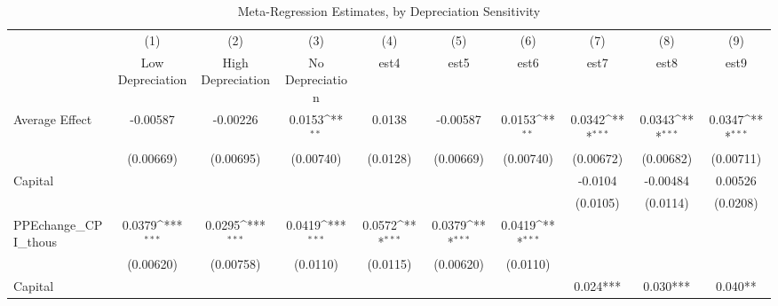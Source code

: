 \begin{table}[htbp]\centering
\def\sym#1{\ifmmode^{#1}\else\(^{#1}\)\fi}
\caption{Meta-Regression Estimates, by Depreciation Sensitivity \label{tab:capsens}}
\begin{tabular}{l*{9}{c}}
\hline\hline
                    &\multicolumn{1}{c}{(1)}&\multicolumn{1}{c}{(2)}&\multicolumn{1}{c}{(3)}&\multicolumn{1}{c}{(4)}&\multicolumn{1}{c}{(5)}&\multicolumn{1}{c}{(6)}&\multicolumn{1}{c}{(7)}&\multicolumn{1}{c}{(8)}&\multicolumn{1}{c}{(9)}\\
                    &\multicolumn{1}{c}{Low Depreciation}&\multicolumn{1}{c}{High Depreciation}&\multicolumn{1}{c}{No Depreciation}&\multicolumn{1}{c}{est4}&\multicolumn{1}{c}{est5}&\multicolumn{1}{c}{est6}&\multicolumn{1}{c}{est7}&\multicolumn{1}{c}{est8}&\multicolumn{1}{c}{est9}\\
\hline
Average Effect      &    -0.00587         &    -0.00226         &      0.0153\sym{**} &      0.0138         &    -0.00587         &      0.0153\sym{**} &      0.0342\sym{***}&      0.0343\sym{***}&      0.0347\sym{***}\\
                    &   (0.00669)         &   (0.00695)         &   (0.00740)         &    (0.0128)         &   (0.00669)         &   (0.00740)         &   (0.00672)         &   (0.00682)         &   (0.00711)         \\
Capital             &                     &                     &                     &                     &                     &                     &     -0.0104         &    -0.00484         &     0.00526         \\
                    &                     &                     &                     &                     &                     &                     &    (0.0105)         &    (0.0114)         &    (0.0208)         \\
PPEchange_CPI_thous &      0.0379\sym{***}&      0.0295\sym{***}&      0.0419\sym{***}&      0.0572\sym{***}&      0.0379\sym{***}&      0.0419\sym{***}&                     &                     &                     \\
                    &   (0.00620)         &   (0.00758)         &    (0.0110)         &    (0.0115)         &   (0.00620)         &    (0.0110)         &                     &                     &                     \\
\hline
Capital             &                     &                     &                     &                     &                     &                     &    0.024***         &    0.030***         &     0.040**         \\

\end{tabular}
\end{table}
